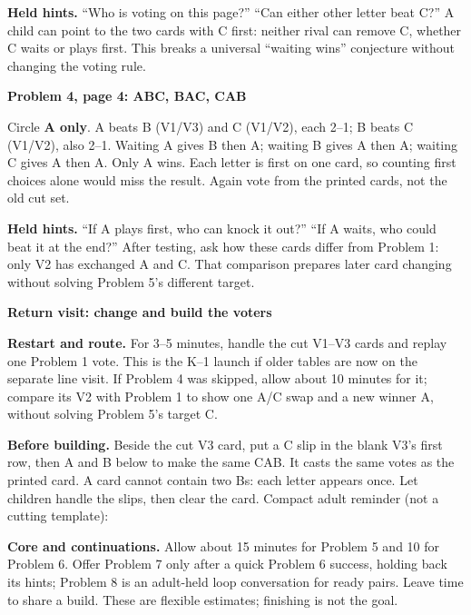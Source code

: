 \documentclass[11pt]{article}
\newcommand{\head}[1]{\par\textbf{\large #1}\par}
\newcommand{\sub}[1]{\par\textbf{#1}\par}
\begin{document}
\textbf{Held hints.} ``Who is voting on this page?'' ``Can either other letter beat C?'' A child can point to the two cards with C first: neither rival can remove C, whether C waits or plays first. This breaks a universal ``waiting wins'' conjecture without changing the voting rule.

\sub{Problem 4, page 4: ABC, BAC, CAB}
Circle \textbf{A only}. A beats B (V1/V3) and C (V1/V2), each 2--1; B beats C (V1/V2), also 2--1. Waiting A gives B then A; waiting B gives A then A; waiting C gives A then A. Only A wins. Each letter is first on one card, so counting first choices alone would miss the result. Again vote from the printed cards, not the old cut set.

\textbf{Held hints.} ``If A plays first, who can knock it out?'' ``If A waits, who could beat it at the end?'' After testing, ask how these cards differ from Problem 1: only V2 has exchanged A and C. That comparison prepares later card changing without solving Problem 5's different target.

\newpage
\head{Return visit: change and build the voters}
\textbf{Restart and route.} For 3--5 minutes, handle the cut V1--V3 cards and replay one Problem 1 vote. This is the K--1 launch if older tables are now on the separate line visit. If Problem 4 was skipped, allow about 10 minutes for it; compare its V2 with Problem 1 to show one A/C swap and a new winner A, without solving Problem 5's target C.

\textbf{Before building.} Beside the cut V3 card, put a C slip in the blank V3's first row, then A and B below to make the same CAB. It casts the same votes as the printed card. A card cannot contain two Bs: each letter appears once. Let children handle the slips, then clear the card. Compact adult reminder (not a cutting template):
\begin{center}
\end{center}
\textbf{Core and continuations.} Allow about 15 minutes for Problem 5 and 10 for Problem 6. Offer Problem 7 only after a quick Problem 6 success, holding back its hints; Problem 8 is an adult-held loop conversation for ready pairs. Leave time to share a build. These are flexible estimates; finishing is not the goal.
\end{document}
